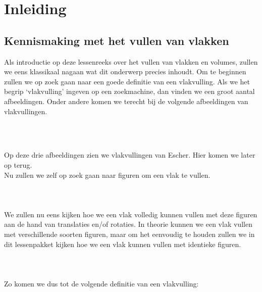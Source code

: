 \section{Inleiding}

\subsection{Kennismaking met het vullen van vlakken}
Als introductie op deze lessenreeks over het vullen van vlakken en volumes, zullen we eens klassikaal nagaan wat dit onderwerp precies inhoudt. Om te beginnen zullen we op zoek gaan naar een goede definitie van een vlakvulling. Als we het begrip `vlakvulling' ingeven op een zoekmachine, dan vinden we een groot aantal afbeeldingen. Onder andere komen we terecht bij de volgende afbeeldingen van vlakvullingen.
\begin{figure}[h]
  \centering
  \\
\end{figure}\\
Op deze drie afbeeldingen zien we vlakvullingen van Escher. Hier komen we later op terug.\\
Nu zullen we zelf op zoek gaan naar figuren om een vlak te vullen.\\ 
\\
\\
\\
We zullen nu eens kijken hoe we een vlak volledig kunnen vullen met deze figuren aan de hand van translaties en/of rotaties. In theorie kunnen we een vlak vullen met verschillende soorten figuren, maar om het eenvoudig te houden zullen we in dit lessenpakket kijken hoe we een vlak kunnen vullen met identieke figuren.\\
\\
\\
\\
Zo komen we dus tot de volgende definitie van een vlakvulling:\\
